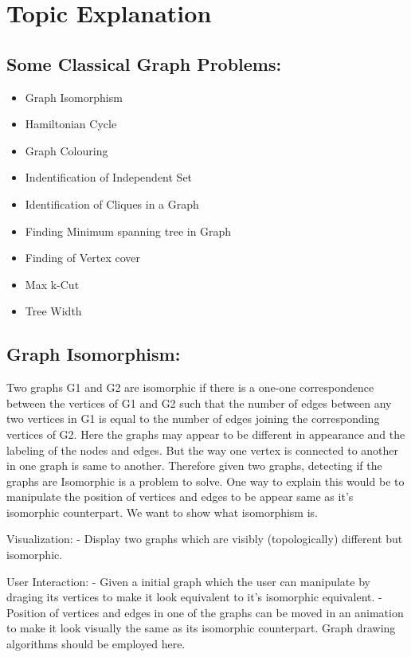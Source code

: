 \hypertarget{topic-explanation}{%
\section{Topic Explanation}\label{topic-explanation}}

\hypertarget{some-classical-graph-problems}{%
\subsection{Some Classical Graph Problems:}\label{some-classical-graph-problems}}

\begin{itemize}
\tightlist
\item
  Graph Isomorphism
\item
  Hamiltonian Cycle
\item
  Graph Colouring
\item
  Indentification of Independent Set
\item
  Identification of Cliques in a Graph
\item
  Finding Minimum spanning tree in Graph
\item
  Finding of Vertex cover
\item
  Max k-Cut
\item
  Tree Width
\end{itemize}

\hypertarget{graph-isomorphism}{%
\subsection{Graph Isomorphism:}\label{graph-isomorphism}}

Two graphs G1 and G2 are isomorphic if there is a one-one correspondence
between the vertices of G1 and G2 such that the number of edges between
any two vertices in G1 is equal to the number of edges joining the
corresponding vertices of G2. Here the graphs may appear to be different
in appearance and the labeling of the nodes and edges. But the way one
vertex is connected to another in one graph is same to another.
Therefore given two graphs, detecting if the graphs are Isomorphic is a
problem to solve. One way to explain this would be to manipulate the
position of vertices and edges to be appear same as it's isomorphic
counterpart. We want to show what isomorphism is.

Visualization: - Display two graphs which are visibly (topologically)
different but isomorphic.

User Interaction: - Given a initial graph which the user can manipulate
by draging its vertices to make it look equivalent to it's isomorphic
equivalent. - Position of vertices and edges in one of the graphs can be
moved in an animation to make it look visually the same as its
isomorphic counterpart. Graph drawing algorithms should be employed
here.


